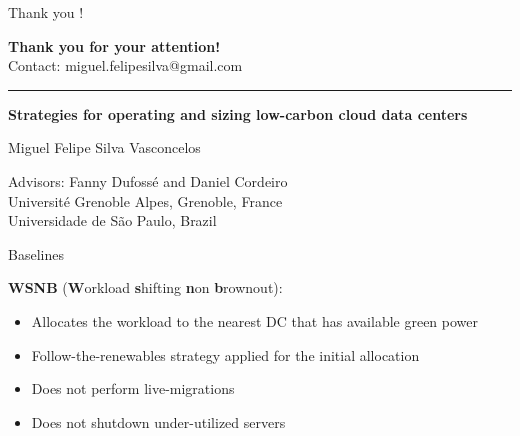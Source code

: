 \documentclass[Ligatures=TeX,table,svgnames,usetotalslideindicator,compress,10pt,aspectratio=169]{beamer}
\begin{document}
\begin{frame}{Thank you !}


\textbf{Thank you for your attention!}\\
Contact: miguel.felipesilva@gmail.com


\par\noindent\rule{\textwidth}{0.5pt}


\begin{center}


\textbf{Strategies for operating and sizing low-carbon cloud data centers}

Miguel Felipe Silva Vasconcelos

Advisors: Fanny Dufossé and Daniel Cordeiro\\

Université Grenoble Alpes, Grenoble, France \\
Universidade de São Paulo, Brazil

\end{center}

\end{frame}

\appendix


\begin{frame}[allowframebreaks]  
  \printbibliography
\end{frame}

\begin{frame}{Baselines}

  \alert{\textbf{WSNB}} (\textbf{W}orkload \textbf{s}hifting
  \textbf{n}on \textbf{b}rownout):

  \begin{itemize}
  \item Allocates the workload to the nearest DC that has available green power
  \item Follow-the-renewables strategy applied for the initial
    allocation
  \item Does not perform live-migrations
  \item Does not shutdown under-utilized servers
  \end{itemize}  
  
\end{frame}
\end{document}
